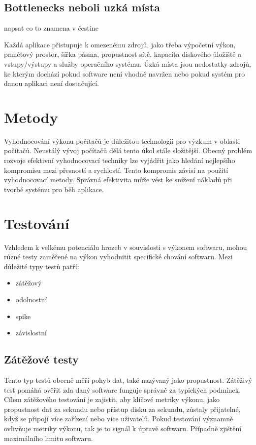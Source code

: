 \subsection*{Bottlenecks neboli uzká místa} napsat co to znamena v čestine

Každá aplikace přistupuje k omezenému zdrojů, jako třeba výpočetní výkon, paměťový prostor, šířka pásma, propustnost sítě, kapacita diskového ůložiště a vstupy/výstupy
a služby operačního systému. Úzká místa jsou nedostatky zdrojů, ke kterým dochází pokud software není vhodně navržen nebo pokud systém pro danou aplikaci není dostačující.

\section{Metody}

Vyhodnocování výkonu počítačů je důležitou technologii pro výzkum v oblasti počítačů. Neustálý vývoj počítačů dělá tento úkol stále složitější.
Obecný problém rozvoje efektivní vyhodnocovací techniky lze vyjádřit jako hledání nejlepšího kompromisu mezi přesností a rychlostí. Tento kompromis závisí na
použití vyhodnocovací metody. Správná efektivita může vést ke snížení nákladů při tvorbě systému pro běh aplikace.

\section{Testování}

Vzhledem k velkému potenciálu hrozeb v souvislosti s výkonem softwaru, mohou různé testy zaměřené na výkon vyhodnitit specifické chování softwaru. Mezi důležité typy testů patří:
\begin{itemize}
    \item{zátěžový}
    \item{odolnostní}
    \item{spike}
    \item{závislostní}
\end{itemize}

\subsection*{Zátěžové testy}

Tento typ testů obecně měří pohyb dat, také nazývaný jako propustnost. Zátěživý test pomáhá ověřit zda daný software funguje správně za typických podmínek. Cílem zátěžového testování je zajistit,
aby klíčové metriky výkonu, jako propustnost dat za sekundu nebo přístup disku za sekundu, zůstaly přijatelné, když se připojí více zařízení nebo více uživatelů. Pokud testování významně
ovlivňuje metriky výkonu, tak je to signál k úpravě softwaru. Případně zjištění maximálního limitu softwaru.

